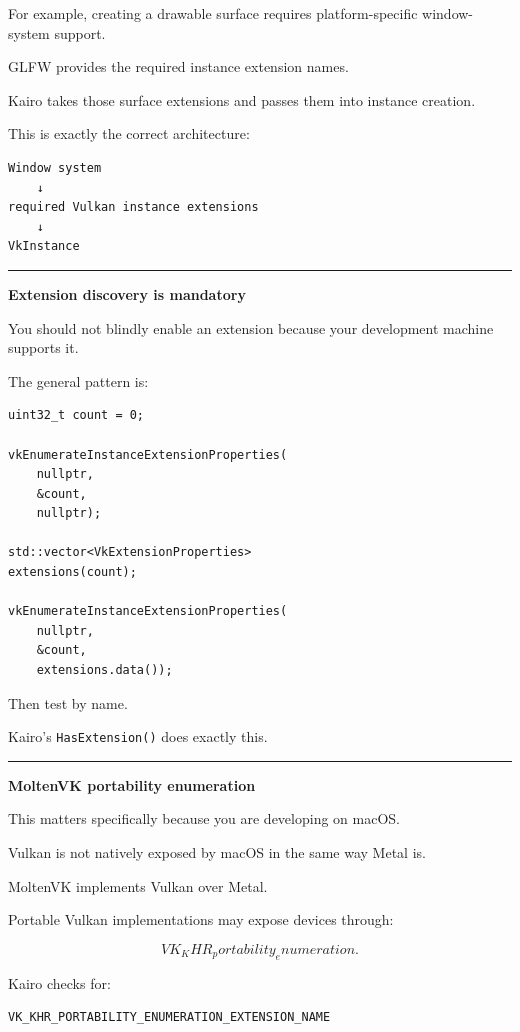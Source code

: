 For example, creating a drawable surface requires platform-specific window-system support.

GLFW provides the required instance extension names.

Kairo takes those surface extensions and passes them into instance creation.

This is exactly the correct architecture:

\begin{verbatim}
Window system
    ↓
required Vulkan instance extensions
    ↓
VkInstance
\end{verbatim}

\begin{center}\rule{0.5\linewidth}{0.5pt}\end{center}

\textbf{Extension discovery is mandatory}

You should not blindly enable an extension because your development machine supports it.

The general pattern is:

\begin{verbatim}
uint32_t count = 0;

vkEnumerateInstanceExtensionProperties(
    nullptr,
    &count,
    nullptr);

std::vector<VkExtensionProperties>
extensions(count);

vkEnumerateInstanceExtensionProperties(
    nullptr,
    &count,
    extensions.data());
\end{verbatim}

Then test by name.

Kairo's \texttt{HasExtension()} does exactly this.

\begin{center}\rule{0.5\linewidth}{0.5pt}\end{center}

\textbf{MoltenVK portability enumeration}

This matters specifically because you are developing on macOS.

Vulkan is not natively exposed by macOS in the same way Metal is.

MoltenVK implements Vulkan over Metal.

Portable Vulkan implementations may expose devices through:

\[
VK_KHR_portability_enumeration.
\]

Kairo checks for:

\begin{verbatim}
VK_KHR_PORTABILITY_ENUMERATION_EXTENSION_NAME
\end{verbatim}

